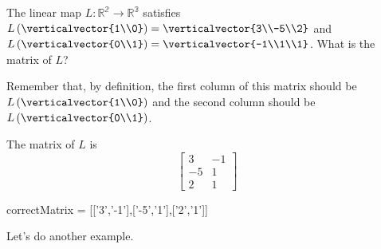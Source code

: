 \documentclass{ximera}
\begin{document}
\begin{question}
  The linear map $L:\mathbb{R^2}\to\mathbb{R^3}$ satisfies
  $L\left(\verticalvector{1\\0}\right) = \verticalvector{3\\-5\\2}$ and
  $L\left(\verticalvector{0\\1}\right) = \verticalvector{-1\\1\\1}$.  What is the
  matrix of $L$?

  \begin{solution}
  	\begin{hint}
  		Remember that, by definition, the first column of this matrix should be $L\left(\verticalvector{1\\0}\right)$ and
  		the second column should be $L\left( \verticalvector{0\\1}\right)$.
  	\end{hint}
  	\begin{hint}
  		The matrix of $L$ is 
  		\[
  			\begin{bmatrix}
  				3&-1\\
  				-5&1\\
  				2&1
  			\end{bmatrix}
  			\]
  	\end{hint}
    \begin{matrix-answer}[name=L]
      correctMatrix = [['3','-1'],['-5','1'],['2','1']]
    \end{matrix-answer}    
  \end{solution}
\end{question}

Let's do another example.
\end{document}
